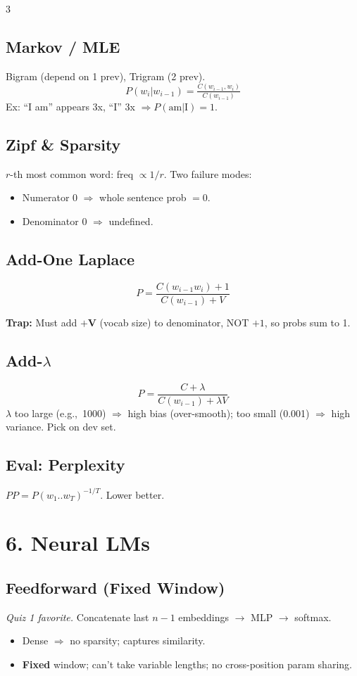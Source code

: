 \documentclass[8pt,a4paper,landscape]{extarticle}
\newcommand{\trap}[1]{{\small\colorbox{yellow!30}{\parbox{0.93\linewidth}{\textbf{\textcolor{red!70!black}{Trap:}} #1}}}}
\begin{document}
\begin{multicols*}{3}
    \subsection*{Markov / MLE}
    Bigram (depend on 1 prev), Trigram (2 prev).
    \[P(w_i|w_{i-1})=\tfrac{C(w_{i-1},w_i)}{C(w_{i-1})}\]
    Ex: ``I am'' appears 3x, ``I'' 3x $\Rightarrow P(\text{am}|\text{I})=1$.

    \subsection*{Zipf \& Sparsity}
    $r$-th most common word: freq $\propto 1/r$. Two failure modes:
    \begin{itemize}
        \item Numerator 0 $\Rightarrow$ whole sentence prob $=0$.
        \item Denominator 0 $\Rightarrow$ undefined.
    \end{itemize}

    \subsection*{Add-One Laplace}
    \[P=\frac{C(w_{i-1}w_i)+1}{C(w_{i-1})+V}\]
    \trap{Must add $\mathbf{+V}$ (vocab size) to denominator, NOT $+1$, so probs sum to 1.}

    \subsection*{Add-$\lambda$}
    \[P=\frac{C+\lambda}{C(w_{i-1})+\lambda V}\]
    $\lambda$ too large (e.g.,\ 1000) $\Rightarrow$ high bias (over-smooth); too small (0.001) $\Rightarrow$ high variance. Pick on dev set.

    \subsection*{Eval: Perplexity}
    $PP=P(w_1..w_T)^{-1/T}$. Lower better.

    \section*{6. Neural LMs}

    \subsection*{Feedforward (Fixed Window)} \emph{Quiz 1 favorite.}
    Concatenate last $n{-}1$ embeddings $\to$ MLP $\to$ softmax.
    \begin{itemize}
        \item[+] Dense $\Rightarrow$ no sparsity; captures similarity.
        \item[--] \textbf{Fixed} window; can't take variable lengths; no cross-position param sharing.
    \end{itemize}


\end{multicols*}
\end{document}
